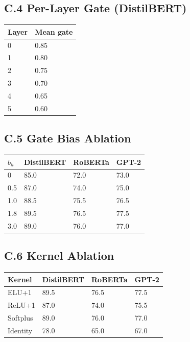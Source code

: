 \subsection{C.4 Per-Layer Gate (DistilBERT)}

\begin{table}[H]
\centering
\small
\begin{tabular}{ll}
\toprule
\textbf{Layer} & \textbf{Mean gate} \\
\midrule
0 & 0.85 \\
1 & 0.80 \\
2 & 0.75 \\
3 & 0.70 \\
4 & 0.65 \\
5 & 0.60 \\
\bottomrule
\end{tabular}
\end{table}

\subsection{C.5 Gate Bias Ablation}

\begin{table}[H]
\centering
\small
\begin{tabular}{llll}
\toprule
\textbf{$b_h$} & \textbf{DistilBERT} & \textbf{RoBERTa} & \textbf{GPT-2} \\
\midrule
0 & 85.0 & 72.0 & 73.0 \\
0.5 & 87.0 & 74.0 & 75.0 \\
1.0 & 88.5 & 75.5 & 76.5 \\
1.8 & 89.5 & 76.5 & 77.5 \\
3.0 & 89.0 & 76.0 & 77.0 \\
\bottomrule
\end{tabular}
\end{table}

\subsection{C.6 Kernel Ablation}

\begin{table}[H]
\centering
\small
\begin{tabular}{llll}
\toprule
\textbf{Kernel} & \textbf{DistilBERT} & \textbf{RoBERTa} & \textbf{GPT-2} \\
\midrule
ELU+1 & 89.5 & 76.5 & 77.5 \\
ReLU+1 & 87.0 & 74.0 & 75.5 \\
Softplus & 89.0 & 76.0 & 77.0 \\
Identity & 78.0 & 65.0 & 67.0 \\
\bottomrule
\end{tabular}
\end{table}

